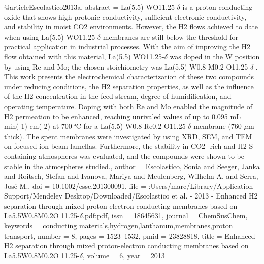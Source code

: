 @article{Escolastico2013a,
abstract = {La(5.5) WO11.25-$\delta$ is a proton-conducting oxide that shows high protonic conductivity, sufficient electronic conductivity, and stability in moist CO2 environments. However, the H2 flows achieved to date when using La(5.5) WO11.25-$\delta$ membranes are still below the threshold for practical application in industrial processes. With the aim of improving the H2 flow obtained with this material, La(5.5) WO11.25-$\delta$ was doped in the W position by using Re and Mo; the chosen stoichiometry was La(5.5) W0.8 M0.2 O11.25-$\delta$ . This work presents the electrochemical characterization of these two compounds under reducing conditions, the H2 separation properties, as well as the influence of the H2 concentration in the feed stream, degree of humidification, and operating temperature. Doping with both Re and Mo enabled the magnitude of H2 permeation to be enhanced, reaching unrivaled values of up to 0.095 mL min(-1) cm(-2) at 700 °C for a La(5.5) W0.8 Re0.2 O11.25-$\delta$ membrane (760 $\mu$m thick). The spent membranes were investigated by using XRD, SEM, and TEM on focused-ion beam lamellas. Furthermore, the stability in CO2 -rich and H2 S-containing atmospheres was evaluated, and the compounds were shown to be stable in the atmospheres studied.},
author = {Escolastico, Sonia and Seeger, Janka and Roitsch, Stefan and Ivanova, Mariya and Meulenberg, Wilhelm A. and Serra, Jos{\'{e}} M.},
doi = {10.1002/cssc.201300091},
file = {:Users/marc/Library/Application Support/Mendeley Desktop/Downloaded/Escolastico et al. - 2013 - Enhanced H2 separation through mixed proton-electron conducting membranes based on La5.5W0.8M0.2O 11.25-$\delta$.pdf:pdf},
issn = {18645631},
journal = {ChemSusChem},
keywords = {conducting materials,hydrogen,lanthanum,membranes,proton transport},
number = {8},
pages = {1523--1532},
pmid = {23828818},
title = {{Enhanced H2 separation through mixed proton-electron conducting membranes based on La5.5W0.8M0.2O 11.25-$\delta$}},
volume = {6},
year = {2013}
}
